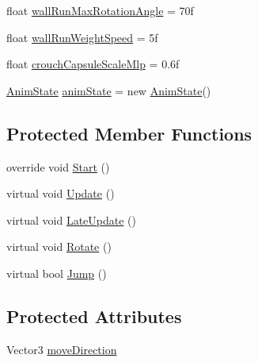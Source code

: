\begin{DoxyCompactItemize}
\item 
float \mbox{\hyperlink{class_root_motion_1_1_demos_1_1_character_third_person_a0da9810ba326b8a6480e853c4791c7da}{wall\+Run\+Max\+Rotation\+Angle}} = 70f
\item 
float \mbox{\hyperlink{class_root_motion_1_1_demos_1_1_character_third_person_a35a917e1954e71db1ac5857dad1358f5}{wall\+Run\+Weight\+Speed}} = 5f
\item 
float \mbox{\hyperlink{class_root_motion_1_1_demos_1_1_character_third_person_a11315f86b1b10af2e473e9d8f5f7fdf6}{crouch\+Capsule\+Scale\+Mlp}} = 0.\+6f
\item 
\mbox{\hyperlink{struct_root_motion_1_1_demos_1_1_character_third_person_1_1_anim_state}{Anim\+State}} \mbox{\hyperlink{class_root_motion_1_1_demos_1_1_character_third_person_a8c25b043492bed516a498f1fcc9c3d60}{anim\+State}} = new \mbox{\hyperlink{struct_root_motion_1_1_demos_1_1_character_third_person_1_1_anim_state}{Anim\+State}}()
\end{DoxyCompactItemize}
\subsection*{Protected Member Functions}
\begin{DoxyCompactItemize}
\item 
override void \mbox{\hyperlink{class_root_motion_1_1_demos_1_1_character_third_person_a6548d90a80293a3a87c51caf7b9b9a93}{Start}} ()
\item 
virtual void \mbox{\hyperlink{class_root_motion_1_1_demos_1_1_character_third_person_acb7780f7d5bc26f3fe5653ffb4773485}{Update}} ()
\item 
virtual void \mbox{\hyperlink{class_root_motion_1_1_demos_1_1_character_third_person_a0f0ae107d845d0881d1f8b1853df7a89}{Late\+Update}} ()
\item 
virtual void \mbox{\hyperlink{class_root_motion_1_1_demos_1_1_character_third_person_a21f2f41f91bacf5d5967a6cb54065140}{Rotate}} ()
\item 
virtual bool \mbox{\hyperlink{class_root_motion_1_1_demos_1_1_character_third_person_a3a946d63323c50359bc62b4da5f6bd8c}{Jump}} ()
\end{DoxyCompactItemize}
\subsection*{Protected Attributes}
\begin{DoxyCompactItemize}
\item 
Vector3 \mbox{\hyperlink{class_root_motion_1_1_demos_1_1_character_third_person_ab3dedbc77d8bb5f669785ffe72808e91}{move\+Direction}}
\end{DoxyCompactItemize}
